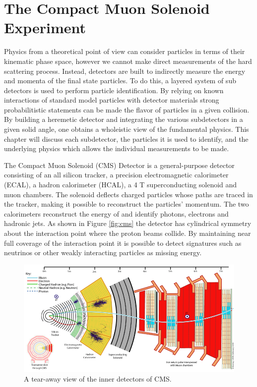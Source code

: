 \chapter{The Compact Muon Solenoid Experiment}

Physics from a theoretical point of view can consider particles in terms of their kinematic 
phase space, however we cannot make direct measurements of the hard scattering process. Instead,
detectors are built to indirectly measure the energy and momenta of the final state particles.
To do this, a layered system of sub detectors is used to perform particle identification. 
By relying on known interactions of standard model particles with detector materials 
strong probabilitistic statements can be made the flavor of particles in a given collision. 
By building a heremetic detector and integrating the various subdetectors in a given 
solid angle, one obtains a wholeistic view of the fundamental physics.
This chapter will discuss each subdetector, the particles it is used to identify, and the 
underlying physics which allows the individual measurements to be made.


The Compact Muon Solenoid (CMS) Detector is a general-purpose detector consisting of 
an all silicon tracker, a precision electromagnetic calorimeter (ECAL), a hadron calorimeter
 (HCAL), a 4 T superconducting solenoid and muon chambers. The solenoid deflects charged
 particles whose paths are traced in the tracker, making it possible to 
reconstruct the particles’ momentum. The two calorimeters reconstruct the energy 
of and identify photons, electrons and hadronic jets.
As shown in Figure \ref{fig:cms} the detector has cylindrical symmetry about the
 interaction point where the proton beams collide. By maintaining near full coverage 
of the interaction point it is possible to detect signatures such as neutrinos or other 
weakly interacting particles as missing energy. 


\begin{figure}
\begin{center}
\includegraphics[width=.95\textwidth]{pics/cms_transverse}
\end{center}
\caption{ A tear-away view of the inner detectors of CMS.}
\label{fig:cms_transverse}
\end{figure}

